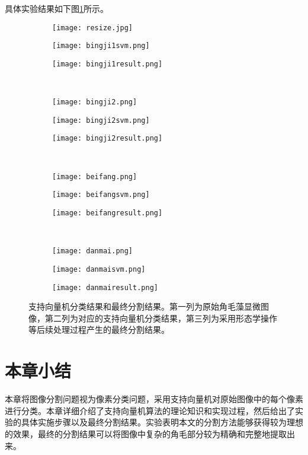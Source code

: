 具体实验结果如下图\ref{svm}所示。
\begin{figure}[!ht]
  \centering
  \begin{subfigure}{0.3\textwidth}
   \texttt{[image: resize.jpg]}
   \caption{}
  \end{subfigure}
  \begin{subfigure}{0.3\textwidth}
    \texttt{[image: bingji1svm.png]}
    \caption{}
  \end{subfigure}
  \begin{subfigure}{0.3\textwidth}
    \texttt{[image: bingji1result.png]}
    \caption{}
  \end{subfigure}
  \\
  \begin{subfigure}{0.3\textwidth}
    \texttt{[image: bingji2.png]}
    \caption{}
  \end{subfigure}
 \begin{subfigure}{0.3\textwidth}
    \texttt{[image: bingji2svm.png]}
    \caption{}
  \end{subfigure}
 \begin{subfigure}{0.3\textwidth}
    \texttt{[image: bingji2result.png]}
    \caption{}
  \end{subfigure}
 \\
 \begin{subfigure}{0.3\textwidth}
    \texttt{[image: beifang.png]}
    \caption{}
  \end{subfigure}
  \begin{subfigure}{0.3\textwidth}
    \texttt{[image: beifangsvm.png]}
    \caption{}
  \end{subfigure}
   \begin{subfigure}{0.3\textwidth}
    \texttt{[image: beifangresult.png]}
    \caption{}
  \end{subfigure}
  \\
   \begin{subfigure}{0.3\textwidth}
    \texttt{[image: danmai.png]}
    \caption{}
  \end{subfigure}
   \begin{subfigure}{0.3\textwidth}
    \texttt{[image: danmaisvm.png]}
    \caption{}
  \end{subfigure}
   \begin{subfigure}{0.3\textwidth}
    \texttt{[image: danmairesult.png]}
    \caption{}
  \end{subfigure}
  \caption{支持向量机分类结果和最终分割结果。第一列为原始角毛藻显微图像，第二列为对应的支持向量机分类结果，第三列为采用形态学操作等后续处理过程产生的最终分割结果。}
  \label{svm}
\end{figure}


\section{本章小结}
本章将图像分割问题视为像素分类问题，采用支持向量机对原始图像中的每个像素进行分类。本章详细介绍了支持向量机算法的理论知识和实现过程，然后给出了实验的具体实施步骤以及最终分割结果。实验表明本文的分割方法能够获得较为理想的效果，最终的分割结果可以将图像中复杂的角毛部分较为精确和完整地提取出来。

 
